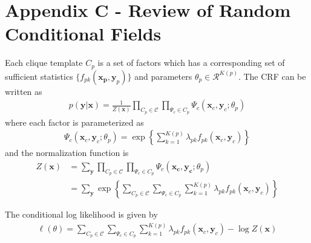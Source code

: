 \section{Appendix C - Review of Random Conditional Fields}
Each clique template $C_p$ is a set of factors which has a corresponding set
of sufficient statistics $\{f_{pk}(\mathbf{x_p}, \mathbf{y}_p)\}$ and
parameters $\theta_p\in\mathcal{R}^{K(p)}$. The CRF can be written as
\begin{align}
p(\mathbf{y}|\mathbf{x}) = \frac{1}{Z(\mathbf{x})}\prod_{C_p\in
\mathcal{C}}\prod_{\Psi_c\in C_p}\Psi_c(\mathbf{x}_c,
\mathbf{y}_c;\theta_p)
\end{align}
where each factor is parameterized as
\begin{align}
\Psi_c(\mathbf{x}_c, \mathbf{y}_c;\theta_p) =
\exp\left\{\sum_{k=1}^{K(p)}\lambda_{pk}f_{pk}(\mathbf{x}_c,
\mathbf{y}_c)\right\}
\end{align}
and the normalization function is 
\begin{align}
Z(\mathbf{x}) 
&= \sum_{\mathbf{y}}\prod_{C_p\in\mathcal{C}}\prod_{\Psi_c\in
C_p}\Psi_c(\mathbf{x_c}, \mathbf{y_c}; \theta_p)\\
&= \sum_{\mathbf{y}}\exp\left\{\sum_{C_p\in\mathcal{C}}\sum_{\Psi_c\in
C_p}\sum_{k=1}^{K(p)}\lambda_{pk}f_{pk}(\mathbf{x}_c,
\mathbf{y}_c)\right\}
\end{align}

The conditional log likelihood is given by 
\begin{align}
\ell(\theta) = \sum_{C_p\in\mathcal{C}}\sum_{\Psi_c\in
C_p}\sum_{k=1}^{K(p)}\lambda_{pk}f_{pk}(\mathbf{x}_c, \mathbf{y}_c) - \log Z(\mathbf{x})
\end{align}


